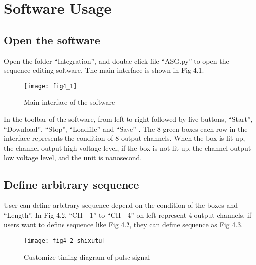 \chapter{\heiti Software Usage}
\section{\heiti Open the software}
Open the folder “Integration”, and double click file “ASG.py” to open the sequence editing software. The main interface is shown in Fig 4.1.
\begin{figure}[ht]
\centering
\texttt{[image: fig4\_1]}
\caption{Main interface of the software}
\end{figure}

In the toolbar of the software, from left to right followed by five buttons, “Start”, “Download”, “Stop”, “Loadfile” and “Save” . The 8 green boxes each row in the interface represents the condition of 8 output channels. When the box is lit up, the channel output high voltage level, if the box is not lit up, the channel output low voltage level, and the unit is nanosecond.

\section{\heiti Define arbitrary sequence}
User can define arbitrary sequence depend on the condition of the boxes and “Length”. In Fig 4.2, “CH - 1” to “CH - 4” on left represent 4 output channels, if users want to define sequence like Fig 4.2, they can define sequence as Fig 4.3.

\newpage
\vspace{0.6cm}
\begin{figure}[H]
\centering
\texttt{[image: fig4\_2\_shixutu]}
\caption{Customize timing diagram of pulse signal}
\end{figure}

